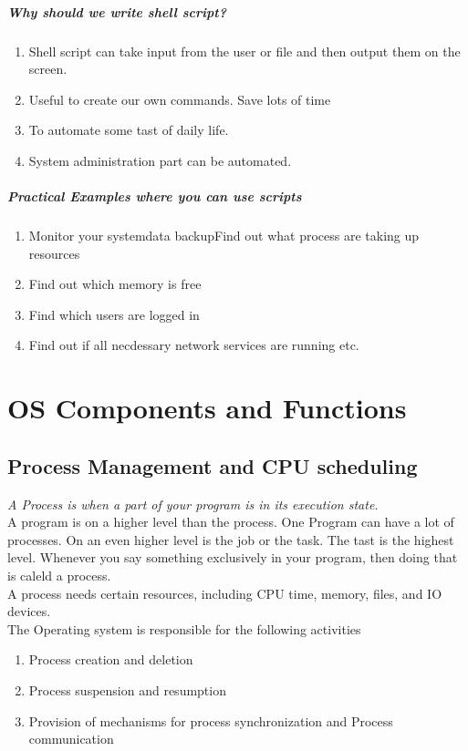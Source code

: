\documentclass[11pt]{article}
\begin{document}
\subparagraph{Why should we write shell script?}
\begin{enumerate}
	\item Shell script can take input from the user or file and then output them on the screen.
	\item Useful to create our own commands. Save lots of time
	\item To automate some tast of daily life.
	\item System administration part can be automated.
\end{enumerate}

\subparagraph{Practical Examples where you can use scripts}
\begin{enumerate}
	\item Monitor your systemdata backupFind out what process are taking up resources
	\item Find out which memory is free
	\item Find which users are logged in
	\item Find out if all necdessary network services are running etc.
\end{enumerate}


\section{OS Components and Functions}

\subsection{Process Management and CPU scheduling}
\textit{A Process is when a part of your program is in its execution state.}\\
A program is on a higher level than the process. One Program can have a lot of processes. On an even higher level is the job or the task. The tast is the highest level. Whenever you say something exclusively in your program, then doing that is caleld a process.\\
A process needs certain resources, including CPU time, memory, files, and IO devices. \\

The Operating system is responsible for the following activities
\begin{enumerate}
	\item Process creation and deletion
	\item Process suspension and resumption
	\item Provision of mechanisms for process synchronization  and Process communication
\end{enumerate}
\end{document}
